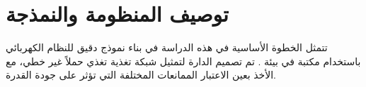 
\section{توصيف المنظومة والنمذجة} \label{part1:sec1}
    {\fontsize{16}{27}\selectfont
    تتمثل الخطوة الأساسية في هذه الدراسة في بناء نموذج دقيق للنظام الكهربائي باستخدام مكتبة  في بيئة . تم تصميم الدارة لتمثيل شبكة تغذية تغذي حملاً غير خطي، مع الأخذ بعين الاعتبار الممانعات المختلفة التي تؤثر على جودة القدرة.
    \par}
    





